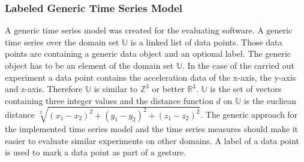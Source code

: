 \subsubsection{Labeled Generic Time Series Model} \label{labeled_generic_time_series_model}
A generic time series model was created for the evaluating software. A generic time series over the domain set
$\mathbb{U}$ is a linked list of data points. Those data points are containing a generic data object and an
optional label. The generic object has to be an element of the domain set $\mathbb{U}$. In the case of the carried out
experiment a data point contains the acceleration data of the x-axis, the y-axis and z-axis. Therefore $\mathbb{U}$ is
similar to $\mathbb{Z}^3$ or better $\mathbb{R}^3$. $\mathbb{U}$ is the set of vectors containing three integer
values and the distance function $d$ on $\mathbb{U}$ is the eucliean distance
$\sqrt[2]{(x_1 - x_2)^2 + (y_1 - y_2)^2 + (z_1 - z_2)^2}$. The generic approach for the implemented time series model
and the time series measures should make it easier to evaluate similar experiments on other domains. A label of a data
point is used to mark a data point as part of a gesture.
